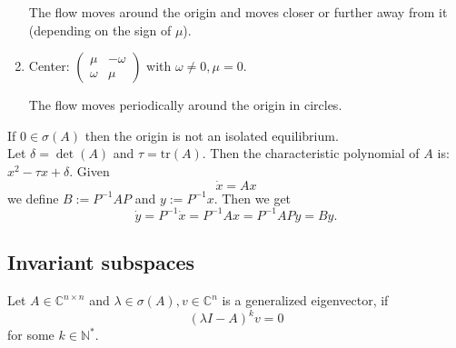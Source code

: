\documentclass{article}
\newcommand*{\N}{\mathbb{N}}
\newcommand*{\C}{\mathbb{C}}
\newcommand*{\Ns}{\N^*}
\newcommand*{\tr}{\text{tr}}
\begin{document}
\begin{enumerate}

    The flow moves around the origin and moves closer or further away from it (depending on the sign of $\mu$).

    \item Center: $\begin{pmatrix}
        \mu & -\omega\\
        \omega & \mu
    \end{pmatrix}$ with $\omega \neq 0, \mu = 0$.


    The flow moves periodically around the origin in circles.
\end{enumerate}

If $0 \in \sigma(A)$ then the origin is not an isolated equilibrium.\\
\newline
Let $\delta = \det(A)$ and $\tau = \tr(A)$. Then the characteristic polynomial of $A$ is: $x^2-\tau x + \delta$.
Given
$$\dot x = Ax$$
we define $B := P^{-1}AP$ and $y := P^{-1}x$. Then we get
$$\dot y = P^{-1}\dot x = P^{-1}Ax = P^{-1}APy = By.$$

\subsection{Invariant subspaces}

\begin{defin}
    Let $A\in\C^{n\times n}$ and $\lambda \in \sigma(A), v \in \C^n$ is a generalized eigenvector, if
    $$(\lambda I-A)^kv=0$$
    for some $k\in\Ns$.
\end{defin}
\end{document}
